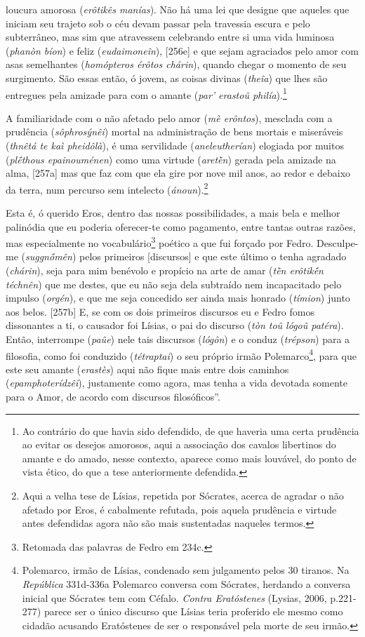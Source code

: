 loucura amorosa (\emph{erôtikês manías}). Não há uma lei que designe que
aqueles que iniciam seu trajeto sob o céu devam passar pela travessia
escura e pelo subterrâneo, mas sim que atravessem celebrando entre si
uma vida luminosa (\emph{phanòn bíon}) e feliz (\emph{eudaimoneîn}),
{[}256e{]} e que sejam agraciados pelo amor com asas semelhantes
(\emph{homópteros érôtos chárin}), quando chegar o momento de seu
surgimento. São essas então, ó jovem, as coisas divinas (\emph{theîa})
que lhes são entregues pela amizade para com o amante (\emph{par'
erastoû philía}).\footnote{Ao contrário do que havia sido defendido, de
  que haveria uma certa prudência ao evitar os desejos amorosos, aqui a
  associação dos cavalos libertinos do amante e do amado, nesse
  contexto, aparece como mais louvável, do ponto de vista ético, do que
  a tese anteriormente defendida.}

A familiaridade com o não afetado pelo amor (\emph{mè erôntos}),
mesclada com a prudência (\emph{sôphrosýnêi}) mortal na administração de
bens mortais e miseráveis (\emph{thnêtá te kaì pheidôlà}), é uma
servilidade (\emph{aneleutherían}) elogiada por muitos (\emph{plḗthous
epainouménen}) como uma virtude (\emph{aretḕn}) gerada pela amizade na
alma, {[}257a{]} mas que faz com que ela gire por nove mil anos, ao
redor e debaixo da terra, num percurso sem intelecto
(\emph{ánoun}).\footnote{Aqui a velha tese de Lísias, repetida por
  Sócrates, acerca de agradar o não afetado por Eros, é cabalmente
  refutada, pois aquela prudência e virtude antes defendidas agora não
  são mais sustentadas naqueles termos.}

Esta é, ó querido Eros, dentro das nossas possibilidades, a mais bela e
melhor palinódia que eu poderia oferecer-te como pagamento, entre tantas
outras razões, mas especialmente no vocabulário\footnote{Retomada das
  palavras de Fedro em 234c.} poético a que fui forçado por Fedro.
Desculpe-me (\emph{suggnṓmên}) pelos primeiros {[}discursos{]} e que
este último o tenha agradado (\emph{chárin}), seja para mim benévolo e
propício na arte de amar (\emph{tḕn erôtikḗn téchnên}) que me destes,
que eu não seja dela subtraído nem incapacitado pelo impulso
(\emph{orgén}), e que me seja concedido ser ainda mais honrado
(\emph{tímion}) junto aos belos. {[}257b{]} E, se com os dois primeiros
discursos eu e Fedro fomos dissonantes a ti, o causador foi Lísias, o
pai do discurso (\emph{tòn toû lógoû patéra}). Então, interrompe
(\emph{paûe}) nele tais discursos (\emph{lógôn}) e o conduz
(\emph{trépson}) para a filosofia, como foi conduzido (\emph{tétraptai})
o seu próprio irmão Polemarco\footnote{Polemarco, irmão de Lísias,
  condenado sem julgamento pelos 30 tiranos. Na \emph{República}
  331d-336a Polemarco conversa com Sócrates, herdando a conversa inicial
  que Sócrates tem com Céfalo. \emph{Contra Eratóstenes} (Lysias, 2006,
  p.221-277) parece ser o único discurso que Lísias teria proferido ele
  mesmo como cidadão acusando Eratóstenes de ser o responsável pela
  morte de seu irmão.}, para que este seu amante (\emph{erastès}) aqui
não fique mais entre dois caminhos (\emph{epamphoterídzêi}), justamente
como agora, mas tenha a vida devotada somente para o Amor, de acordo com
discursos filosóficos''.

